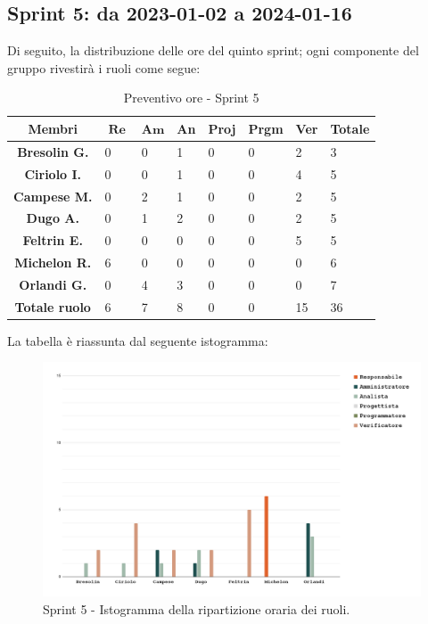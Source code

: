 \documentclass[10pt, a4paper]{article}
\begin{document}
\subsection{Sprint 5: da 2023-01-02 a 2024-01-16}
Di seguito, la distribuzione delle ore del quinto sprint; ogni componente del gruppo rivestirà i ruoli come segue:
\begin{table}[H]
    \begin{tabularx}{\textwidth}{c|X|X|X|X|X|X|X}
        \textbf{Membri} & $\operatorname{\textbf{Re}}$ & $\mathrm{\textbf{Am}}$ & \textbf{An} & \textbf{Proj} & \textbf{Prgm} & \textbf{Ver} & \textbf{Totale} \\
        \hline
        \textbf{Bresolin G.} & 0 & 0 & 1 & 0 & 0 & \cellcolor{primarycolor}2 & 3 \\
        \hline
        \textbf{Ciriolo I.}  & 0 & 0 & 1 & 0 & 0 & \cellcolor{primarycolor}4 & 5 \\
        \hline
        \textbf{Campese M.}  & 0 & \cellcolor{primarycolor}2 & 1 & 0 & 0 & 2 & 5 \\
        \hline
        \textbf{Dugo A.}     & 0 & 1 & \cellcolor{primarycolor}2 & 0 & 0 & 2 & 5 \\
        \hline
        \textbf{Feltrin E.}  & 0 & 0 & 0 & 0 & 0 &\cellcolor{primarycolor} 5 & 5 \\
        \hline
        \textbf{Michelon R.} & \cellcolor{primarycolor}6 & 0 & 0 & 0 & 0 & 0 & 6 \\
        \hline
        \textbf{Orlandi G.}  & 0 & 4 & \cellcolor{primarycolor}3 & 0 & 0 & 0 & 7 \\
        \hline
        \textbf{Totale ruolo} & 6 & 7 & 8 & 0 & 0 & 15 & 36 \\
    \end{tabularx}
    \caption{Preventivo ore - Sprint 5}
\end{table}

La tabella è riassunta dal seguente istogramma:
 \begin{figure}[H]
        \centering        
        \includegraphics[width=15.5cm]{istogrammi/istogramma_5_periodo.png}
        \caption{Sprint 5 - Istogramma della ripartizione oraria dei ruoli. }
    \end{figure}
\end{document}
